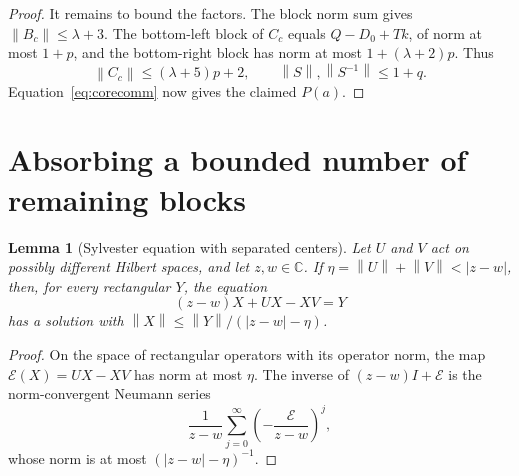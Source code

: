\documentclass[11pt]{article}
\newtheorem{lemma}[theorem]{Lemma}
\theoremstyle{remark}
\newcommand{\C}{\mathbb C}
\newcommand{\norm}[1]{\left\lVert#1\right\rVert}
\numberwithin{equation}{section}
\begin{document}
\begin{proof}
It remains to bound the factors. The block norm sum gives
$\norm{B_c}\le\lambda+3$. The bottom-left block of $C_c$ equals $Q-D_0+Tk$,
of norm at most $1+p$, and the bottom-right block has norm at most
$1+(\lambda+2)p$. Thus
\[
 \norm{C_c}\le(\lambda+5)p+2,\qquad
 \norm S,\norm{S^{-1}}\le1+q.
\]
Equation~\eqref{eq:corecomm} now gives the claimed $P(a)$.
\end{proof}

\section{Absorbing a bounded number of remaining blocks}\label{sec:shears}
\begin{lemma}[Sylvester equation with separated centers]\label{lem:sylvester}
Let $U$ and $V$ act on possibly different Hilbert spaces, and let $z,w\in\C$.
If $\eta=\norm U+\norm V<|z-w|$, then, for every rectangular $Y$, the equation
\[
 (z-w)X+UX-XV=Y
\]
has a solution with
$\norm X\le\norm Y/(|z-w|-\eta)$.
\end{lemma}
\begin{proof}
On the space of rectangular operators with its operator norm, the map
$\mathcal E(X)=UX-XV$ has norm at most $\eta$. The inverse of
$(z-w)I+\mathcal E$ is the norm-convergent Neumann series
\[
 \frac1{z-w}\sum_{j=0}^\infty
       \left(-\frac{\mathcal E}{z-w}\right)^j,
\]
whose norm is at most $(|z-w|-\eta)^{-1}$.
\end{proof}
\end{document}
